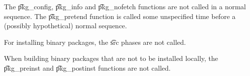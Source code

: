 
The \t{pkg_config}, \t{pkg_info} and \t{pkg_nofetch} functions are not called in a normal
sequence. The \t{pkg_pretend} function is called some unspecified time before a (possibly
hypothetical) normal sequence.

For installing binary packages, the \t{src} phases are not called.

When building binary packages that are not to be installed locally, the \t{pkg_preinst}
and \t{pkg_postinst} functions are not called.


